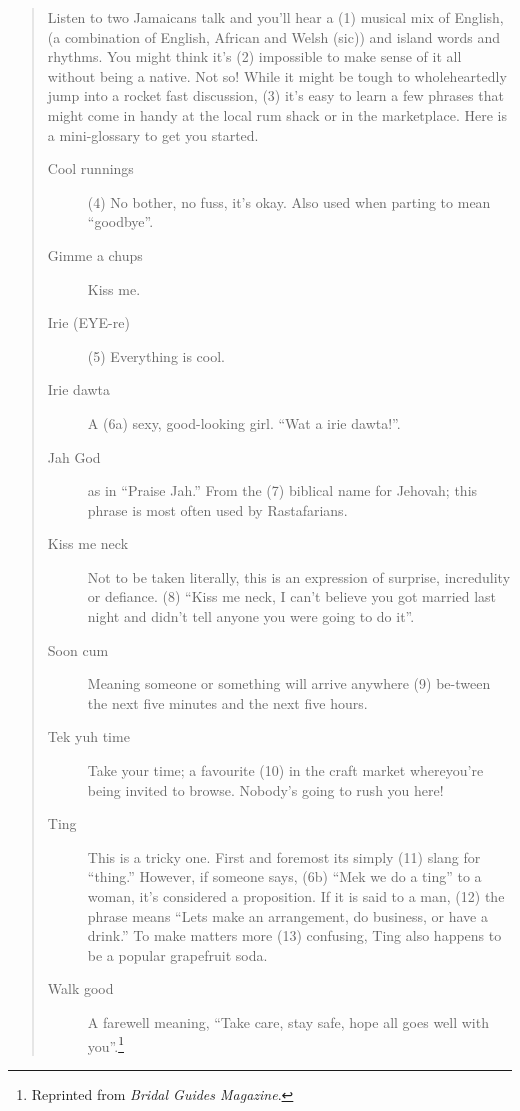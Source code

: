 \begin{quote}
Listen to two Jamaicans talk and you’ll hear a (1) musical mix of English,  (a combination of English, African and Welsh (sic)) and island words and rhythms.  You might think it’s (2) impossible to make sense of it all without being a native.  Not so!  While it might be tough to wholeheartedly jump into a rocket fast discussion, (3) it’s easy to learn a few phrases that might come in handy at the local rum shack or in the marketplace.  Here is a mini-glossary to get you started.

\begin{description}
\item[Cool runnings]  (4) No bother, no fuss, it’s okay.  Also used when parting to mean “goodbye”.
\item[Gimme a chups]  Kiss me.
\item[Irie (EYE-re)]  (5) Everything is cool.
\item[Irie dawta]  A (6a) sexy, good-looking girl.  “Wat a irie dawta!”.
\item[Jah God]  as in “Praise Jah.”  From the (7) biblical name for Jehovah; this phrase is most often used by Rastafarians.
\item[Kiss me neck]  Not to be taken literally, this is an expression of surprise, incredulity or defiance.  (8) “Kiss me neck, I can’t believe you got married last night and didn’t tell anyone you were going to do it”.
\item[Soon cum]  Meaning someone or something will arrive anywhere (9) be-\linebreak tween the next five minutes and the next five hours.
\item[Tek yuh time]  Take your time; a favourite (10) in the craft market where\linebreak you're being invited to browse.  Nobody’s going to rush you here!
\item[Ting]  This is a tricky one.  First and foremost its simply (11) slang for “thing.”  However, if someone says, (6b) “Mek we do a ting” to a woman, it’s considered a proposition.  If it is said to a man, (12) the phrase means “Lets make an arrangement, do business, or have a drink.”  To make matters more (13) confusing, Ting also happens to be a popular grapefruit soda.
\item[Walk good]  A farewell meaning, “Take care, stay safe, hope all goes well with you”.\footnote{Reprinted from \textit{Bridal Guides Magazine}.}
\end{description}
\end{quote}  

